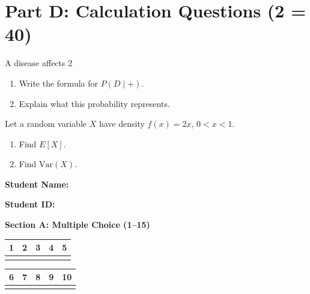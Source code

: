 \documentclass{CWNUExam}
\begin{document}
\section{Part D: Calculation Questions (2  = 40)}

\begin{problem}
A disease affects 2%
\begin{enumerate}
\item Write the formula for $P(D\mid +)$.
\item Explain what this probability represents.
\end{enumerate}
\end{problem}

\begin{problem}
Let a random variable $X$ have density $f(x)=2x$, $0<x<1$.
\begin{enumerate}
\item Find $E[X]$.
\item Find $\mathrm{Var}(X)$.
\end{enumerate}
\end{problem}




\newpage

\noindent\textbf{Student Name:} \underline{\hspace{6cm}}

\textbf{Student ID:} \underline{\hspace{6cm}}

\vspace{0.6cm}
\noindent\textbf{Section A: Multiple Choice (1--15)}\\[0.2cm]
\noindent
\begin{tabular}{|c|c|c|c|c|}
\hline
1 & 2 & 3 & 4 & 5  \\
\hline
\underline{\hspace{1.6cm}} & \underline{\hspace{1.6cm}} & \underline{\hspace{1.6cm}} & \underline{\hspace{1.6cm}} & \underline{\hspace{1.6cm}}  \\
\hline
\end{tabular}

\begin{tabular}{|c|c|c|c|c|}
\hline
6 & 7 & 8 & 9 & 10  \\
\hline
\underline{\hspace{1.6cm}} & \underline{\hspace{1.6cm}} & \underline{\hspace{1.6cm}} & \underline{\hspace{1.6cm}} & \underline{\hspace{1.6cm}}  \\
\hline
\end{tabular}
\end{document}
